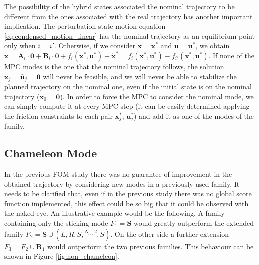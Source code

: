 \documentclass[12,twoside]{TFG-GM}
\theoremstyle{definition}
\theoremstyle{remark}
\newcommand*\diff[1]{\bar{#1}}
\begin{document}
The possibility of the hybrid states associated the nominal trajectory to be different from the ones associated with the real trajectory has another important implication. The perturbation state motion equation \ref{eq:condensed_motion_linear} has the nominal trajectory as an equilibrium point only when $i = i'$. Otherwise, if we consider $\textbf{x} = \textbf{x}^*$ and $\textbf{u} = \textbf{u}^*$, we obtain $\diff{\textbf{x}} = \textbf{A}_i \cdot \textbf{0} + \textbf{B}_i \cdot \textbf{0} + f_i(\textbf{x}^*, \textbf{u}^*) - \dot{\textbf{x}}^* = f_i(\textbf{x}^*, \textbf{u}^*) - f_{i'}(\textbf{x}^*, \textbf{u}^*)$. If none of the MPC modes is the one that the nominal trajectory follows, the solution $\diff{\textbf{x}}_j = \diff{\textbf{u}}_j = \textbf{0}$ will never be feasible, and we will never be able to stabilize the planned trajectory on the nominal one, even if the initial state is on the nominal trajectory ($\textbf{x}_0 = \textbf{0}$). In order to force the MPC to consider the nominal mode, we can simply compute it at every MPC step (it can be easily determined applying the friction constraints to each pair $\textbf{x}_j^*$, $\textbf{u}_j^*$) and add it as one of the modes of the family.

\subsection{Chameleon Mode}
\label{subsec:chameleon}

In the previous FOM study there was no guarantee of improvement in the obtained trajectory by considering new modes in a previously used family. It needs to be clarified that, even if in the previous study there was no global score function implemented, this effect could be so big that it could be observed with the naked eye. An illustrative example would be the following. A family containing only the sticking mode $F_1 = \textbf{S}$ would greatly outperform the extended family $F_2 = \textbf{S} \cup (L, R, S, \stackrel{N-2}{\cdots}, S)$. On the other side a further extension $F_3 = F_2 \cup \textbf{R}_1$ would outperform the two previous families. This behaviour can be shown in Figure \ref{fig:non_chameleon}.
\end{document}

